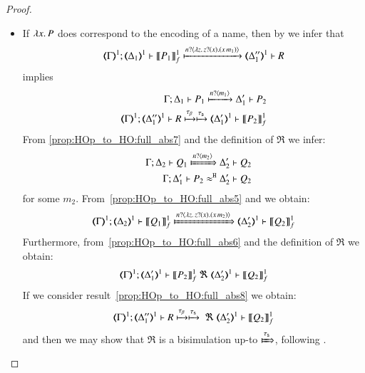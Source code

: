 \begin{proof}
\begin{enumerate}[1.]
\begin{itemize}
	\item If $\lambda x.\,P$ does correspond to the encoding of a name, then by 
	  we infer that
%
	\[
		\horel{\mapt{\Gamma}^{1}}{\mapt{\Delta_1}^{1}}{\pmapp{P_1}{1}{f}}{\hby{\bactinp{n}{\abs{z}{ \binp{z}{x} (\appl{x}{m_1})}}}}{\mapt{\Delta_1''}^{1}} R %
	\]
%
	\noi implies
%
	\begin{eqnarray}
		\horel{\Gamma}{\Delta_1}{P_1}{\hby{\bactinp{n}{m_1}}}{\Delta_1'}{P_2}
		\label{prop:HOp_to_HO:full_abs7}
\\
		\horel{\mapt{\Gamma}^{1}}{\mapt{\Delta_1''}^{1}}{R}{\hby{\btau} \hby{\stau}}{\mapt{\Delta_1'}^{1}}{\pmapp{P_2}{1}{f}}
		\label{prop:HOp_to_HO:full_abs8}
	\end{eqnarray}
%
%
	\noi From \eqref{prop:HOp_to_HO:full_abs7} and the definition of $\Re$ we infer:
%
	\begin{eqnarray}
		&&\horel{\Gamma}{\Delta_2}{Q_1}{\Hby{\bactinp{n}{m_2}}}{\Delta_2'}{Q_2}
		\label{prop:HOp_to_HO:full_abs5}
		\\
		&&\horel{\Gamma}{\Delta_1'}{P_2}{\hwb}{\Delta_2'}{Q_2}
		\label{prop:HOp_to_HO:full_abs6}
	\end{eqnarray}
%
	\noi for some $m_2$. From~\eqref{prop:HOp_to_HO:full_abs5} and  we obtain:
%
	\[
		\horel{\mapt{\Gamma}^{1}}{\mapt{\Delta_2}^{1}}{\pmapp{Q_1}{1}{f}}{\Hby{\bactinp{n}{\abs{z}{\binp{z}{x} (\appl{x}{m_2})}}}}{\mapt{\Delta_2'}^{1}}{\pmapp{Q_2}{1}{f}}
	\]
%
	\noi Furthermore, from~\eqref{prop:HOp_to_HO:full_abs6} and the definition of $\Re$ we obtain:
%
	\[
		\horel{\mapt{\Gamma}^{1}}{\mapt{\Delta_1'}^{1}}{\pmapp{P_2}{1}{f}}{\ \Re\ }{\mapt{\Delta_2'}^{1}}{\pmapp{Q_2}{1}{f}}
	\]
%
	\noi If we consider result~\eqref{prop:HOp_to_HO:full_abs8} we obtain:
%
	\[
		\horel{\mapt{\Gamma}^{1}}{\mapt{\Delta_1''}^{1}}{R}{\hby{\btau}\hby{\stau}\ \Re\ }{\mapt{\Delta_2'}^{1}}{\pmapp{Q_2}{1}{f}}
	\]
	and then we may show that $\Re$ is a bisimulation up-to $\Hby{\stau}$,
	following . 
	\end{itemize}
\end{enumerate}
\end{proof}





